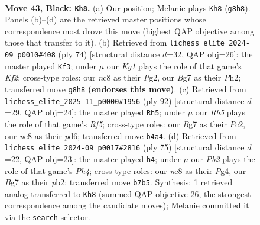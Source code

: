 \documentclass[11pt]{article}
\begin{document}
\clearpage

\begin{figure}[p]\centering
\begin{subfigure}{0.46\textwidth}\centering
\resizebox{\linewidth}{!}{%
\newchessgame
\chessboard[
  setfen={2N3k1/1p4b1/6p1/5p1p/Pr6/R5PP/5P1K/4r3 b - - 2 43},
  showmover=false,
  pgfstyle=straightmove, color=movearrow, markmove={g8-h8}
]}
\caption{}
\end{subfigure}\hfill
\begin{subfigure}{0.46\textwidth}\centering
\resizebox{\linewidth}{!}{%
\newchessgame
\chessboard[
  setfen={8/3k4/1pr2p2/1R2pP2/2p5/2P5/PP3KPP/8 w - - 3 38},
  showmover=false,
  pgfstyle=straightmove, color=movearrow, markmove={f2-f3}
]}
\caption{}
\end{subfigure}
\\[4pt]
\begin{subfigure}{0.46\textwidth}\centering
\resizebox{\linewidth}{!}{%
\newchessgame
\chessboard[
  setfen={8/8/1kpprp2/p4R2/P7/1P1K4/2P2P2/8 w - - 2 47},
  showmover=false,
  pgfstyle=straightmove, color=movearrow, markmove={f5-h5}
]}
\caption{}
\end{subfigure}\hfill
\begin{subfigure}{0.46\textwidth}\centering
\resizebox{\linewidth}{!}{%
\newchessgame
\chessboard[
  setfen={8/1p4k1/p7/P2P3p/2K1P1p1/7r/1P3R1P/8 b - - 0 38},
  showmover=false,
  pgfstyle=straightmove, color=movearrow, markmove={h5-h4}
]}
\caption{}
\end{subfigure}
\caption{\textbf{Move 43, Black: \texttt{Kh8}.} (a) Our position; Melanie plays \texttt{Kh8} (\texttt{g8h8}). Panels (b)--(d) are the retrieved master positions whose correspondence most drove this move (highest QAP objective among those that transfer to it). (b) Retrieved from \texttt{lichess\_elite\_2024-09\_p0010\#408} (ply 74) [structural distance $d$=32, QAP obj=26]: the master played \texttt{Kf3}; under $\mu$ our \emph{Kg1} plays the role of that game's \emph{Kf2}; cross-type roles: our \emph{n}c8 as their \emph{P}g2, our \emph{B}g7 as their \emph{P}h2; transferred move \texttt{g8h8} \textbf{(endorses this move)}. (c) Retrieved from \texttt{lichess\_elite\_2025-11\_p0000\#1956} (ply 92) [structural distance $d$=29, QAP obj=24]: the master played \texttt{Rh5}; under $\mu$ our \emph{Rb5} plays the role of that game's \emph{Rf5}; cross-type roles: our \emph{B}g7 as their \emph{P}c2, our \emph{n}c8 as their \emph{p}d6; transferred move \texttt{b4a4}. (d) Retrieved from \texttt{lichess\_elite\_2024-09\_p0017\#2816} (ply 75) [structural distance $d$=22, QAP obj=23]: the master played \texttt{h4}; under $\mu$ our \emph{Pb2} plays the role of that game's \emph{Ph4}; cross-type roles: our \emph{n}c8 as their \emph{P}g4, our \emph{B}g7 as their \emph{p}b2; transferred move \texttt{b7b5}. Synthesis: 1 retrieved analog transferred to \texttt{Kh8} (summed QAP objective 26, the strongest correspondence among the candidate moves); Melanie committed it via the \texttt{search} selector.}
\label{fig:thought-m85}
\end{figure}
\end{document}

